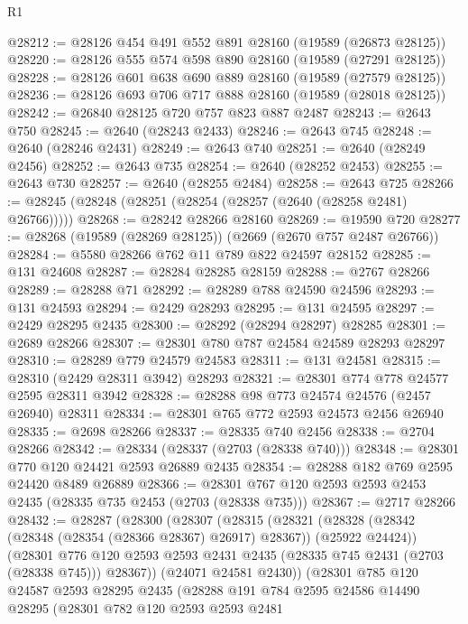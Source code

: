 \begin{lexlean}{R1}
\begin{coremodule}
@28212 := @28126 @454 @491 @552 @891 @28160 (@19589 (@26873 @28125))
@28220 := @28126 @555 @574 @598 @890 @28160 (@19589 (@27291 @28125))
@28228 := @28126 @601 @638 @690 @889 @28160 (@19589 (@27579 @28125))
@28236 := @28126 @693 @706 @717 @888 @28160 (@19589 (@28018 @28125))
@28242 := @26840 @28125 @720 @757 @823 @887 @2487
@28243 := @2643 @750
@28245 := @2640 (@28243 @2433)
@28246 := @2643 @745
@28248 := @2640 (@28246 @2431)
@28249 := @2643 @740
@28251 := @2640 (@28249 @2456)
@28252 := @2643 @735
@28254 := @2640 (@28252 @2453)
@28255 := @2643 @730
@28257 := @2640 (@28255 @2484)
@28258 := @2643 @725
@28266 := @28245 (@28248 (@28251 (@28254 (@28257 (@2640 (@28258 @2481) @26766)))))
@28268 := @28242 @28266 @28160
@28269 := @19590 @720
@28277 := @28268 (@19589 (@28269 @28125)) (@2669 (@2670 @757 @2487 @26766))
@28284 := @5580 @28266 @762 @11 @789 @822 @24597 @28152
@28285 := @131 @24608
@28287 := @28284 @28285 @28159
@28288 := @2767 @28266
@28289 := @28288 @71
@28292 := @28289 @788 @24590 @24596
@28293 := @131 @24593
@28294 := @2429 @28293
@28295 := @131 @24595
@28297 := @2429 @28295 @2435
@28300 := @28292 (@28294 @28297) @28285
@28301 := @2689 @28266
@28307 := @28301 @780 @787 @24584 @24589 @28293 @28297
@28310 := @28289 @779 @24579 @24583
@28311 := @131 @24581
@28315 := @28310 (@2429 @28311 @3942) @28293
@28321 := @28301 @774 @778 @24577 @2595 @28311 @3942
@28328 := @28288 @98 @773 @24574 @24576 (@2457 @26940) @28311
@28334 := @28301 @765 @772 @2593 @24573 @2456 @26940
@28335 := @2698 @28266
@28337 := @28335 @740 @2456
@28338 := @2704 @28266
@28342 := @28334 (@28337 (@2703 (@28338 @740)))
@28348 := @28301 @770 @120 @24421 @2593 @26889 @2435
@28354 := @28288 @182 @769 @2595 @24420 @8489 @26889
@28366 := @28301 @767 @120 @2593 @2593 @2453 @2435 (@28335 @735 @2453 (@2703 (@28338 @735)))
@28367 := @2717 @28266
@28432 := @28287
    (@28300
      (@28307
        (@28315
          (@28321
            (@28328 (@28342 (@28348 (@28354 (@28366 @28367) @26917) @28367)) (@25922 @24424))
            (@28301
              @776
              @120
              @2593
              @2593
              @2431
              @2435
              (@28335 @745 @2431 (@2703 (@28338 @745)))
              @28367))
          (@24071 @24581 @2430))
        (@28301
          @785
          @120
          @24587
          @2593
          @28295
          @2435
          (@28288
            @191
            @784
            @2595
            @24586
            @14490
            @28295
            (@28301
              @782
              @120
              @2593
              @2593
              @2481

\end{coremodule}
\end{lexlean}
